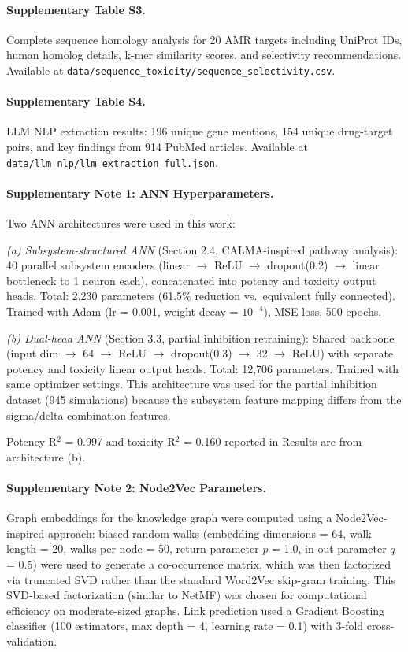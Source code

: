 \documentclass[12pt,a4paper]{article}
\begin{document}
\paragraph{Supplementary Table S3.} Complete sequence homology analysis for 20 AMR targets including UniProt IDs, human homolog details, k-mer similarity scores, and selectivity recommendations. Available at \texttt{data/sequence\_toxicity/sequence\_selectivity.csv}.

\paragraph{Supplementary Table S4.} LLM NLP extraction results: 196 unique gene mentions, 154 unique drug-target pairs, and key findings from 914 PubMed articles. Available at \texttt{data/llm\_nlp/llm\_extraction\_full.json}.

\paragraph{Supplementary Note 1: ANN Hyperparameters.} Two ANN architectures were used in this work:

\textit{(a) Subsystem-structured ANN} (Section 2.4, CALMA-inspired pathway analysis): 40 parallel subsystem encoders (linear $\rightarrow$ ReLU $\rightarrow$ dropout(0.2) $\rightarrow$ linear bottleneck to 1 neuron each), concatenated into potency and toxicity output heads. Total: 2,230 parameters (61.5\% reduction vs.\ equivalent fully connected). Trained with Adam (lr = 0.001, weight decay = $10^{-4}$), MSE loss, 500 epochs.

\textit{(b) Dual-head ANN} (Section 3.3, partial inhibition retraining): Shared backbone (input dim $\rightarrow$ 64 $\rightarrow$ ReLU $\rightarrow$ dropout(0.3) $\rightarrow$ 32 $\rightarrow$ ReLU) with separate potency and toxicity linear output heads. Total: 12,706 parameters. Trained with same optimizer settings. This architecture was used for the partial inhibition dataset (945 simulations) because the subsystem feature mapping differs from the sigma/delta combination features.

Potency R$^2$ = 0.997 and toxicity R$^2$ = 0.160 reported in Results are from architecture (b).

\paragraph{Supplementary Note 2: Node2Vec Parameters.} Graph embeddings for the knowledge graph were computed using a Node2Vec-inspired approach: biased random walks (embedding dimensions = 64, walk length = 20, walks per node = 50, return parameter $p$ = 1.0, in-out parameter $q$ = 0.5) were used to generate a co-occurrence matrix, which was then factorized via truncated SVD rather than the standard Word2Vec skip-gram training. This SVD-based factorization (similar to NetMF) was chosen for computational efficiency on moderate-sized graphs. Link prediction used a Gradient Boosting classifier (100 estimators, max depth = 4, learning rate = 0.1) with 3-fold cross-validation.
\end{document}
